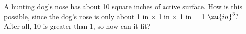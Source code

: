  A hunting dog's nose has about 10 square inches of active
surface. How is this possible, since the dog's nose is only
about 1 in $\times$ 1 in $\times$ 1 in = 1 $\zu{in}^3?$ After all, 10 is
greater than 1, so how can it fit?
